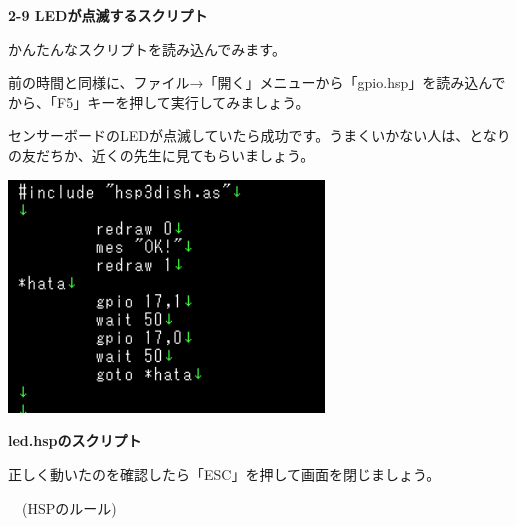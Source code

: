 \documentclass[a4paper,dvipdfmx]{jarticle}
\newcommand\textstyleqwerty[1]{#1}
\begin{document}
\bigskip


\bigskip

{\bfseries
2-9 LEDが点滅するスクリプト}


\bigskip

かんたんなスクリプトを読み込んでみます。

前の時間と同様に、ファイル→「開く」メニューから「gpio.hsp」を読み込んでから、「F5」キーを押して実行してみましょう。

センサーボードのLEDが点滅していたら成功です。うまくいかない人は、となりの友だちか、近くの先生に見てもらいましょう。



\begin{center}
\includegraphics[width=8.387cm,height=6.17cm]{text02-img/text02-img023.png}

\end{center}

\bigskip


\bigskip


\bigskip


\bigskip


\bigskip


\bigskip


\bigskip


\bigskip


\bigskip


\bigskip


\bigskip

\textstyleqwerty{\textbf{led.hspのスクリプト}}


\bigskip


\bigskip


\bigskip


\bigskip

正しく動いたのを確認したら「ESC」を押して画面を閉じましょう。


\bigskip

\ \ (HSPのルール)
\end{document}
